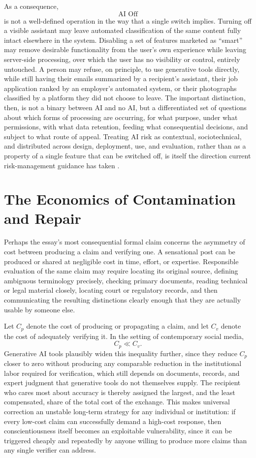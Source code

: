 \documentclass[11pt]{article}
\begin{document}
As a consequence,
\[
\operatorname{AI\ Off}
\]
is not a well-defined operation in the way that a single switch implies. Turning off a visible assistant may leave automated classification of the same content fully intact elsewhere in the system. Disabling a set of features marketed as ``smart'' may remove desirable functionality from the user's own experience while leaving server-side processing, over which the user has no visibility or control, entirely untouched. A person may refuse, on principle, to use generative tools directly, while still having their emails summarized by a recipient's assistant, their job application ranked by an employer's automated system, or their photographs classified by a platform they did not choose to leave. The important distinction, then, is not a binary between AI and no AI, but a differentiated set of questions about which forms of processing are occurring, for what purpose, under what permissions, with what data retention, feeding what consequential decisions, and subject to what route of appeal. Treating AI risk as contextual, sociotechnical, and distributed across design, deployment, use, and evaluation, rather than as a property of a single feature that can be switched off, is itself the direction current risk-management guidance has taken \cite{nist2023airmf}.

\section{The Economics of Contamination and Repair}

Perhaps the essay's most consequential formal claim concerns the asymmetry of cost between producing a claim and verifying one. A sensational post can be produced or shared at negligible cost in time, effort, or expertise. Responsible evaluation of the same claim may require locating its original source, defining ambiguous terminology precisely, checking primary documents, reading technical or legal material closely, locating court or regulatory records, and then communicating the resulting distinctions clearly enough that they are actually usable by someone else.

Let \(C_p\) denote the cost of producing or propagating a claim, and let \(C_v\) denote the cost of adequately verifying it. In the setting of contemporary social media,
\[
C_p \ll C_v.
\]
Generative AI tools plausibly widen this inequality further, since they reduce \(C_p\) closer to zero without producing any comparable reduction in the institutional labor required for verification, which still depends on documents, records, and expert judgment that generative tools do not themselves supply. The recipient who cares most about accuracy is thereby assigned the largest, and the least compensated, share of the total cost of the exchange. This makes universal correction an unstable long-term strategy for any individual or institution: if every low-cost claim can successfully demand a high-cost response, then conscientiousness itself becomes an exploitable vulnerability, since it can be triggered cheaply and repeatedly by anyone willing to produce more claims than any single verifier can address.
\end{document}

